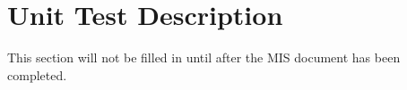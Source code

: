 \documentclass[12pt, titlepage]{article}
\begin{document}

\section{Unit Test Description}
This section will not be filled in until after the MIS document has been completed.







\end{document}
